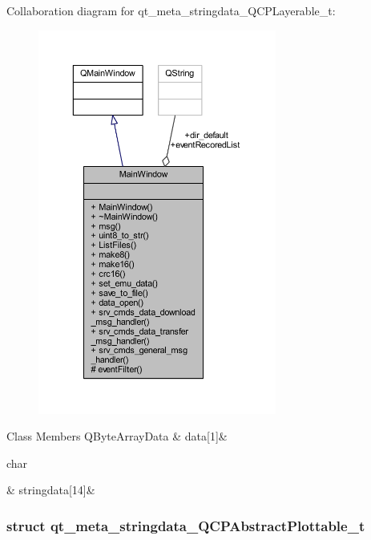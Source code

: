 Collaboration diagram for qt\+\_\+meta\+\_\+stringdata\+\_\+\+Q\+C\+P\+Layerable\+\_\+t\+:
\nopagebreak
\begin{figure}[H]
\begin{center}
\leavevmode
\includegraphics[width=222pt]{d4/d66/a00289}
\end{center}
\end{figure}
\begin{DoxyFields}{Class Members}
\hypertarget{a00067_a08a4a1de23442a83952a11d68453ab4d}{Q\+Byte\+Array\+Data}\label{a00067_a08a4a1de23442a83952a11d68453ab4d}
&
data\mbox{[}1\mbox{]}&
\\
\hline

\hypertarget{a00067_a4dff397c178a0aa24e1087e6ab89c187}{char}\label{a00067_a4dff397c178a0aa24e1087e6ab89c187}
&
stringdata\mbox{[}14\mbox{]}&
\\
\hline

\end{DoxyFields}
\label{dd/da2/a00192}
\hypertarget{a00067_dd/da2/a00192}{}
\subsubsection{struct qt\+\_\+meta\+\_\+stringdata\+\_\+\+Q\+C\+P\+Abstract\+Plottable\+\_\+t}


